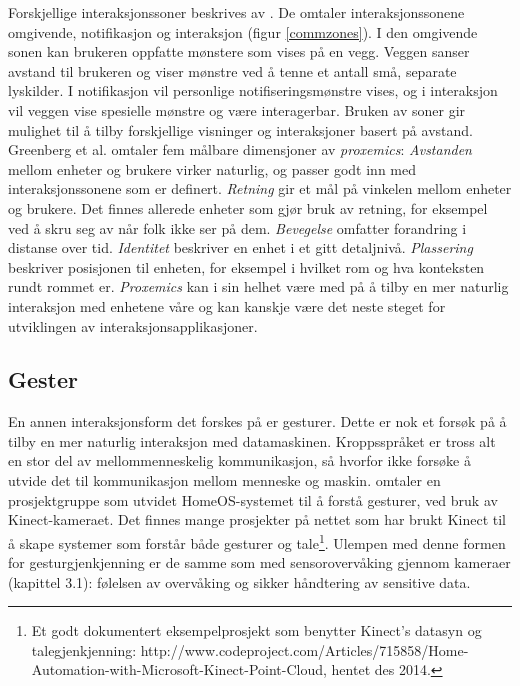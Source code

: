 Forskjellige interaksjonssoner beskrives av \citet{streitz05}. De omtaler interaksjonssonene omgivende, notifikasjon og interaksjon (figur \ref{commzones}). I den omgivende sonen kan brukeren oppfatte mønstere som vises på en vegg. Veggen sanser avstand til brukeren og viser mønstre ved å tenne et antall små, separate lyskilder. I notifikasjon vil personlige notifiseringsmønstre vises, og i interaksjon vil veggen vise spesielle mønstre og være interagerbar. Bruken av soner gir mulighet til å tilby forskjellige visninger og interaksjoner basert på avstand. Greenberg et al. omtaler fem målbare dimensjoner av \emph{proxemics}: \emph{Avstanden} mellom enheter og brukere virker naturlig, og passer godt inn med interaksjonssonene som er definert. \emph{Retning} gir et mål på vinkelen mellom enheter og brukere. Det finnes allerede enheter som gjør bruk av retning, for eksempel ved å skru seg av når folk ikke ser på dem. \emph{Bevegelse} omfatter forandring i distanse over tid. \emph{Identitet} beskriver en enhet i et gitt detaljnivå. \emph{Plassering} beskriver posisjonen til enheten, for eksempel i hvilket rom og hva konteksten rundt rommet er. \emph{Proxemics} kan i sin helhet være med på å tilby en mer naturlig interaksjon med enhetene våre og kan kanskje være det neste steget for utviklingen av interaksjonsapplikasjoner.

\subsection*{Gester}
En annen interaksjonsform det forskes på er gesturer. Dette er nok et forsøk på å tilby en mer naturlig interaksjon med datamaskinen. Kroppsspråket er tross alt en stor del av mellommenneskelig kommunikasjon, så hvorfor ikke forsøke å utvide det til kommunikasjon mellom menneske og maskin. \citet{homeos} omtaler en prosjektgruppe som utvidet HomeOS-systemet til å forstå gesturer, ved bruk av Kinect-kameraet. Det finnes mange prosjekter på nettet som har brukt Kinect til å skape systemer som forstår både gesturer og tale\footnote{Et godt dokumentert eksempelprosjekt som benytter Kinect's datasyn og talegjenkjenning: http://www.codeproject.com/Articles/715858/Home-Automation-with-Microsoft-Kinect-Point-Cloud, hentet des 2014.}. Ulempen med denne formen for gesturgjenkjenning er de samme som med sensorovervåking gjennom kameraer (kapittel 3.1): følelsen av overvåking og sikker håndtering av sensitive data. 

